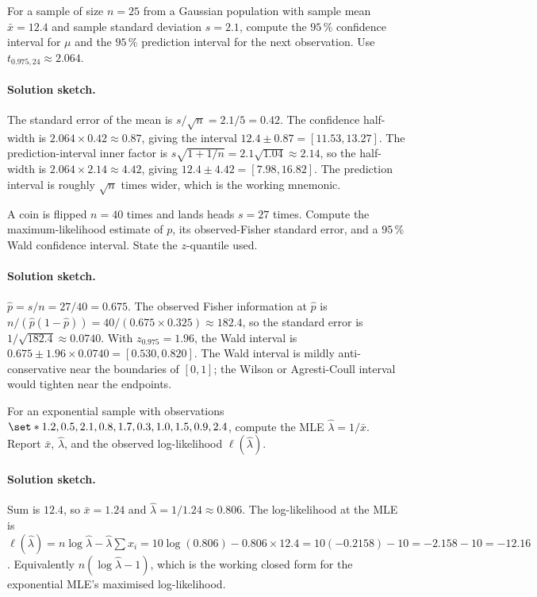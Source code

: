 \begin{exercise}
For a sample of size $n = 25$ from a Gaussian population with
sample mean $\bar{x} = 12.4$ and sample standard deviation $s =
2.1$, compute the $95\,\%$ confidence interval for $\mu$ and the
$95\,\%$ prediction interval for the next observation. Use
$t_{0.975, 24} \approx 2.064$.

\paragraph{Solution sketch.} The standard error of the mean is
$s/\sqrt{n} = 2.1/5 = 0.42$. The confidence half-width is
$2.064 \times 0.42 \approx 0.87$, giving the interval
$12.4 \pm 0.87 = [11.53, 13.27]$. The prediction-interval inner
factor is $s\sqrt{1 + 1/n} = 2.1\sqrt{1.04} \approx 2.14$, so the
half-width is $2.064 \times 2.14 \approx 4.42$, giving
$12.4 \pm 4.42 = [7.98, 16.82]$. The prediction interval is
roughly $\sqrt{n}$ times wider, which is the working mnemonic.
\end{exercise}

\begin{exercise}
A coin is flipped $n = 40$ times and lands heads $s = 27$ times.
Compute the maximum-likelihood estimate of $p$, its observed-Fisher
standard error, and a $95\,\%$ Wald confidence interval. State the
$z$-quantile used.

\paragraph{Solution sketch.} $\hat{p} = s/n = 27/40 = 0.675$. The
observed Fisher information at $\hat{p}$ is $n/(\hat{p}(1-\hat{p}))
= 40/(0.675 \times 0.325) \approx 182.4$, so the standard error is
$1/\sqrt{182.4} \approx 0.0740$. With $z_{0.975} = 1.96$, the Wald
interval is $0.675 \pm 1.96 \times 0.0740 = [0.530, 0.820]$. The
Wald interval is mildly anti-conservative near the boundaries of
$[0, 1]$; the Wilson or Agresti-Coull interval would tighten near
the endpoints.
\end{exercise}

\begin{exercise}
For an exponential sample with observations $\set*{1.2, 0.5, 2.1,
0.8, 1.7, 0.3, 1.0, 1.5, 0.9, 2.4}$, compute the MLE
$\hat{\lambda} = 1/\bar{x}$. Report $\bar{x}$, $\hat{\lambda}$, and
the observed log-likelihood $\ell(\hat{\lambda})$.

\paragraph{Solution sketch.} Sum is $12.4$, so $\bar{x} = 1.24$
and $\hat{\lambda} = 1/1.24 \approx 0.806$. The log-likelihood at
the MLE is $\ell(\hat{\lambda}) = n\log\hat{\lambda} -
\hat{\lambda}\sum x_{i} = 10\log(0.806) - 0.806 \times 12.4 =
10(-0.2158) - 10 = -2.158 - 10 = -12.16$. Equivalently
$n(\log\hat{\lambda} - 1)$, which is the working closed form for
the exponential MLE's maximised log-likelihood.
\end{exercise}

